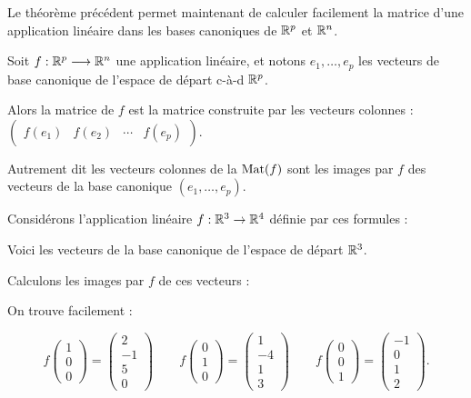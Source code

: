 \change

Le théorème précédent permet maintenant de calculer facilement la matrice d'une application linéaire
dans les bases canoniques de $\mathbb{R}^p$ et $\mathbb{R}^n$.

Soit $f: \mathbb{R}^p \longrightarrow \mathbb{R}^n$ une application linéaire, 
et notons $e_1, \ldots , e_p$ 
les vecteurs de base canonique de l'espace de départ c-à-d $\mathbb{R}^p$. 

Alors la matrice de $f$ est la matrice construite par les vecteurs colonnes :
$\begin{pmatrix} f(e_1)&f(e_2)& \cdots& f(e_p)\end{pmatrix}$.


Autrement dit les vecteurs colonnes de la $\mathop{\mathrm{Mat}}\nolimits(f)$
sont les images par $f$ des vecteurs de la base canonique $(e_1, \ldots , e_p)$.


\diapo

Considérons l'application linéaire $f : \mathbb{R}^3 \to \mathbb{R}^4$ définie 
par ces formules :

\change
Voici les vecteurs de la base canonique de l'espace de départ $\mathbb{R}^3$.

\change

  Calculons les images par $f$ de ces vecteurs :
  
  On trouve facilement :
  
$$f\begin{pmatrix} 1 \\ 0 \\ 0 \end{pmatrix} = \begin{pmatrix} 2 \\ -1 \\ 5 \\ 0 \end{pmatrix}\qquad 
  f\begin{pmatrix} 0 \\ 1 \\ 0 \end{pmatrix} = \begin{pmatrix} 1 \\ -4 \\ 1 \\ 3 \end{pmatrix}\qquad
  f\begin{pmatrix} 0 \\ 0 \\ 1 \end{pmatrix} = \begin{pmatrix} -1 \\ 0 \\ 1 \\ 2 \end{pmatrix}.
  $$


